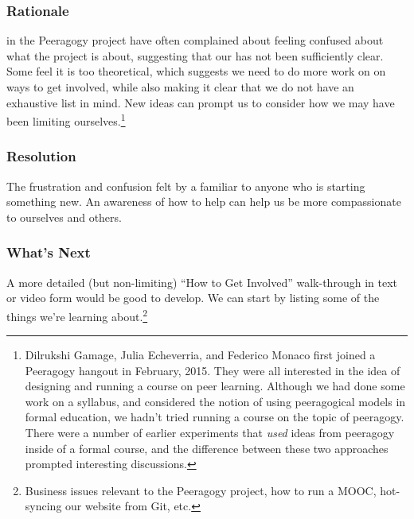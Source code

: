 \subsubsection*{Rationale}  in the Peeragogy project have often complained
about feeling confused about what the project is about, suggesting that our 
has not been sufficiently clear.  Some feel it is too theoretical, which suggests
we need to do more work on  on ways to get involved, while also
making it clear that we do not have an exhaustive list in mind.  New ideas can prompt us to consider how we may have been limiting ourselves.\footnote{Dilrukshi Gamage, Julia Echeverria, and Federico Monaco first joined a Peeragogy hangout in February, 2015.  They were all interested in the idea of designing and running a course on peer learning.  Although we had done some work on a syllabus, and considered the notion of using peeragogical models in formal education, we hadn't tried running a course on the topic of peeragogy.  There were a number of earlier experiments that \emph{used} ideas from peeragogy inside of a formal course, and the difference between these two approaches prompted interesting discussions.}

\subsubsection*{Resolution}
The frustration and confusion felt by a  familiar to anyone who is starting something new.  An awareness of how to help  can help us be more compassionate to ourselves and others.

\subsubsection*{What's Next} A more detailed (but non-limiting) ``How to Get Involved'' walk-through in text or video form would be good to develop. We can start by listing some of the things we're learning about.\footnote{Business issues relevant to the Peeragogy project, how to run a MOOC, hot-syncing our website from Git, etc.}
